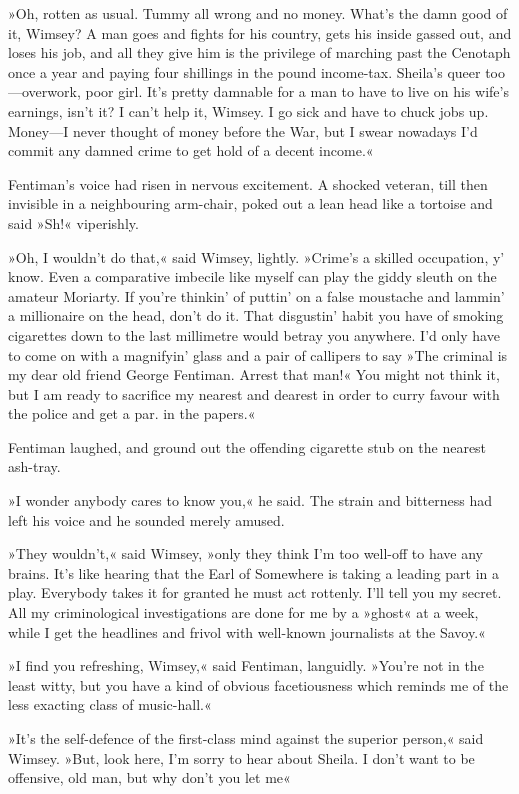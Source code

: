 »Oh, rotten as usual. Tummy all wrong and no money. What's the damn good of it, Wimsey? A man goes and fights for his country, gets his inside gassed out, and loses his job, and all they give him is the privilege of marching past the Cenotaph once a year and paying four shillings in the pound income-tax. Sheila's queer too—overwork, poor girl. It's pretty damnable for a man to have to live on his wife's earnings, isn't it? I can't help it, Wimsey. I go sick and have to chuck jobs up. Money—I never thought of money before the War, but I swear nowadays I'd commit any damned crime to get hold of a decent income.«

Fentiman's voice had risen in nervous excitement. A shocked veteran, till then invisible in a neighbouring arm-chair, poked out a lean head like a tortoise and said »Sh!« viperishly.

»Oh, I wouldn't do that,« said Wimsey, lightly. »Crime's a skilled occupation, y' know. Even a comparative imbecile like myself can play the giddy sleuth on the amateur Moriarty. If you're thinkin' of puttin' on a false moustache and lammin' a millionaire on the head, don't do it. That disgustin' habit you have of smoking cigarettes down to the last millimetre would betray you anywhere. I'd only have to come on with a magnifyin' glass and a pair of callipers to say »The criminal is my dear old friend George Fentiman. Arrest that man!« You might not think it, but I am ready to sacrifice my nearest and dearest in order to curry favour with the police and get a par. in the papers.«

Fentiman laughed, and ground out the offending cigarette stub on the nearest ash-tray.

»I wonder anybody cares to know you,« he said. The strain and bitterness had left his voice and he sounded merely amused.

»They wouldn't,« said Wimsey, »only they think I'm too well-off to have any brains. It's like hearing that the Earl of Somewhere is taking a leading part in a play. Everybody takes it for granted he must act rottenly. I'll tell you my secret. All my criminological investigations are done for me by a »ghost« at  a week, while I get the headlines and frivol with well-known journalists at the Savoy.«

»I find you refreshing, Wimsey,« said Fentiman, languidly. »You're not in the least witty, but you have a kind of obvious facetiousness which reminds me of the less exacting class of music-hall.«

»It's the self-defence of the first-class mind against the superior person,« said Wimsey. »But, look here, I'm sorry to hear about Sheila. I don't want to be offensive, old man, but why don't you let me\longdash«

